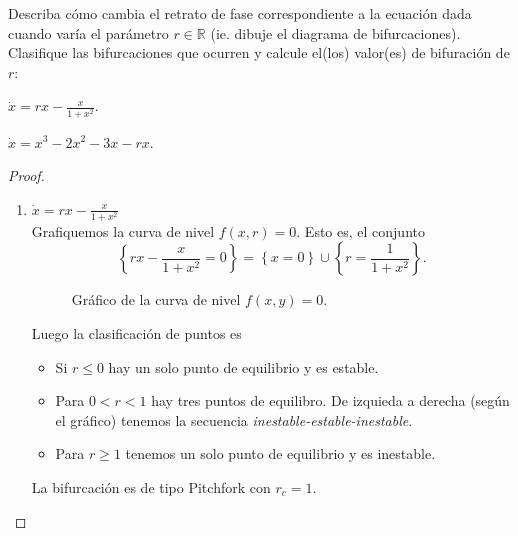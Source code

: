 \begin{problema}[Bifurcaciones]
Describa cómo cambia el retrato de fase correspondiente a la ecuación dada
cuando varía el parámetro \(r\in \mathbb{R}\) (ie. dibuje el diagrama de
bifurcaciones). Clasifique las bifurcaciones que ocurren y calcule el(los)
valor(es) de bifuración de \(r\):
\begin{plist}
    \item \(\dot{x} = rx - \frac{x}{1+x^2}\).
    \item \(\dot{x} = x^3 - 2x^2 - 3x - rx\).
\end{plist}
\end{problema}
\begin{proof}
\begin{enumerate}[
label=(\alph*),topsep=0pt,itemsep=0pt,leftmargin=1.5em,rightmargin=1em]
\item \(\dot{x} = rx - \frac{x}{1+x^2}\) \\
   Grafiquemos la curva de nivel \(f(x,r) = 0\). Esto es, el conjunto
   \[
       \left\{ rx - \frac{x}{1+x^2} = 0 \right\}
       =
       \left\{ x = 0 \right\}
       \cup
       \left\{ r = \frac{1}{1+x^2} \right\}
   .\]

%
{%
    \begin{figure}[H]
    \caption{Gráfico de la curva de nivel \(f(x,y) = 0\).}
    \centering
    \end{figure}
}%
{%
    Luego la clasificación de puntos es
    \begin{itemize}[itemsep=0pt, leftmargin=2em, rightmargin=2em]
        \item Si \(r \le 0\) hay un solo punto de equilibrio y es estable.
        \item Para \(0 < r < 1\) hay tres puntos de equilibro. De izquieda a
        derecha (según el gráfico) tenemos la secuencia
        {\it inestable-estable-inestable}.
        \item Para \(r\ge 1\) tenemos un solo punto de equilibrio y es
        inestable.
    \end{itemize}
    La bifurcación es de tipo Pitchfork con \(r_c = 1\).
}


\end{enumerate}
\end{proof}

